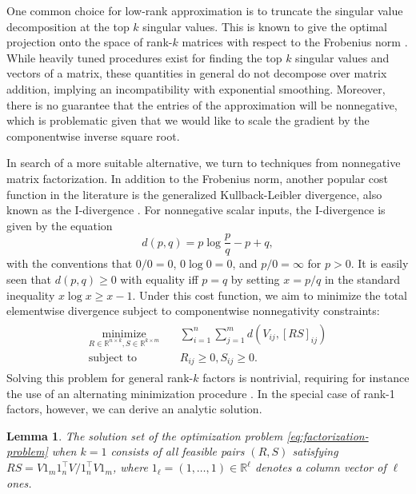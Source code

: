 \documentclass{article}
\newtheorem{lemma}{Lemma}
\begin{document}
One common choice for low-rank approximation is to truncate the singular value decomposition at the top $k$ singular values. This is known to give the optimal projection onto the space of rank-$k$ matrices with respect to the Frobenius norm \cite{Eckart36Approximation}. While heavily tuned procedures exist for finding the top $k$ singular values and vectors of a matrix, these quantities in general do not decompose over matrix addition, implying an incompatibility with exponential smoothing. Moreover, there is no guarantee that the entries of the approximation will be nonnegative, which is problematic given that we would like to scale the gradient by the componentwise inverse square root.

In search of a more suitable alternative, we turn to techniques from nonnegative matrix factorization. In addition to the Frobenius norm, another popular cost function in the literature is the generalized Kullback-Leibler divergence, also known as the I-divergence \cite{Lee99Learning}. For nonnegative scalar inputs, the I-divergence is given by the equation $$d(p, q) = p \log \frac{p}{q} - p + q,$$ with the conventions that $0/0 = 0$, $0 \log 0 = 0$, and $p / 0 = \infty$ for $p > 0$. It is easily seen that $d(p, q) \ge 0$ with equality iff $p = q$ by setting $x = p/q$ in the standard inequality $x \log x \ge x - 1$. Under this cost function, we aim to minimize the total elementwise divergence subject to componentwise nonnegativity constraints:
\begin{align}
\begin{split}
\underset{R \in \mathbb{R}^{n \times k}, S \in \mathbb{R}^{k \times m}}{\text{minimize}} \quad & \sum_{i=1}^n \sum_{j=1}^m d(V_{ij}, [RS]_{ij}) \\
\text{subject to} \quad & R_{ij} \ge 0, S_{ij} \ge 0.
\end{split}
\label{eq:factorization-problem}
\end{align}
Solving this problem for general rank-$k$ factors is nontrivial, requiring for instance the use of an alternating minimization procedure \cite{Finesso06Nonnegative}. In the special case of rank-1 factors, however, we can derive an analytic solution.

\begin{lemma}
The solution set of the optimization problem \eqref{eq:factorization-problem} when $k = 1$ consists of all feasible pairs $(R, S)$ satisfying $R S = V 1_m 1_n^\top V / 1_n^\top V 1_m$, where $1_\ell = (1, \dots, 1) \in \mathbb{R}^\ell$ denotes a column vector of $\ell$ ones.
\end{lemma}
\end{document}
